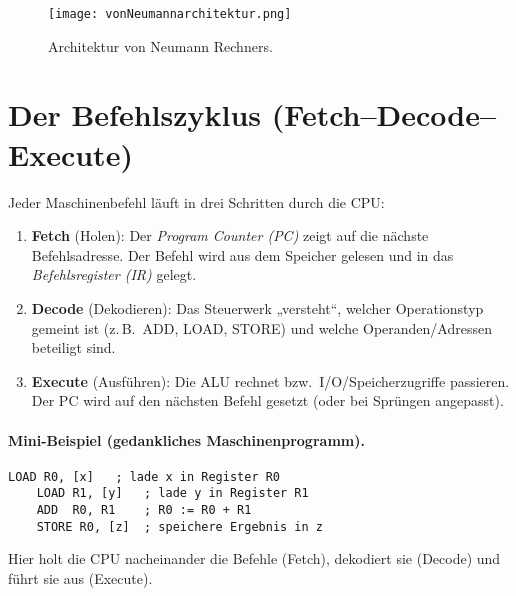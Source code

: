 \documentclass[../skript/main.tex]{subfiles}
\begin{document}
\begin{figure}[H]
	\centering
	\texttt{[image: vonNeumannarchitektur.png]}
	\caption{Architektur von Neumann Rechners.}
	\label{fig:vonNeumannarchitektur}
\end{figure}

\section{Der Befehlszyklus (Fetch–Decode–Execute)}
Jeder Maschinenbefehl läuft in drei Schritten durch die CPU:
\begin{enumerate}
	\item \textbf{Fetch} (Holen): Der \emph{Program Counter (PC)} zeigt auf die nächste Befehlsadresse.
	Der Befehl wird aus dem Speicher gelesen und in das \emph{Befehlsregister (IR)} gelegt.
	\item \textbf{Decode} (Dekodieren): Das Steuerwerk „versteht“, welcher Operationstyp gemeint ist
	(z.\,B.\ ADD, LOAD, STORE) und welche Operanden/Adressen beteiligt sind.
	\item \textbf{Execute} (Ausführen): Die ALU rechnet bzw.\ I/O/Speicherzugriffe passieren.
	Der PC wird auf den nächsten Befehl gesetzt (oder bei Sprüngen angepasst).
\end{enumerate}

\paragraph{Mini-Beispiel (gedankliches Maschinenprogramm).}
\begin{lstlisting}[caption={Addition zweier Speicherstellen und Ablage des Ergebnisses}]
	LOAD R0, [x]   ; lade x in Register R0
	LOAD R1, [y]   ; lade y in Register R1
	ADD  R0, R1    ; R0 := R0 + R1
	STORE R0, [z]  ; speichere Ergebnis in z
\end{lstlisting}
Hier holt die CPU nacheinander die Befehle (Fetch), dekodiert sie (Decode) und führt sie aus (Execute).
\end{document}

